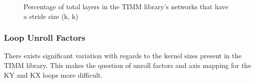 \begin{figure}
    \centering
    \caption{Percentage of total layers in the TIMM library's networks that have a stride size (k, k)}
    \label{fig:kernel_stats:strides}
\end{figure}



\subsubsection{Loop Unroll Factors}
\label{chap:dda:dataflow_dse:pruning:applying_it:loop_unroll_factors}

There exists significant variation with regards to the kernel sizes present in
the TIMM library. This makes the question of unroll factors and axis mapping for
the KY and KX loops more difficult.

